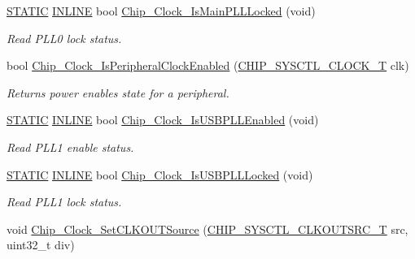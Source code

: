 \begin{DoxyCompactItemize}
\hyperlink{group__LPC__Types__Public__Macros_ga10b2d890d871e1489bb02b7e70d9bdfb}{S\+T\+A\+T\+IC} \hyperlink{group__LPC__Types__Public__Types_ga2eb6f9e0395b47b8d5e3eeae4fe0c116}{I\+N\+L\+I\+NE} bool \hyperlink{group__CLOCK__17XX__40XX_gaaa21bfa511cd25dc4f4394709dc58ced}{Chip\+\_\+\+Clock\+\_\+\+Is\+Main\+P\+L\+L\+Locked} (void)
\begin{DoxyCompactList}\small\item\em Read P\+L\+L0 lock status. \end{DoxyCompactList}\item 
bool \hyperlink{group__CLOCK__17XX__40XX_ga0d7f762be4d4293d10d379fcc0b2388b}{Chip\+\_\+\+Clock\+\_\+\+Is\+Peripheral\+Clock\+Enabled} (\hyperlink{group__CLOCK__17XX__40XX_ga82e75cbe777e79f448fec3987ddd978e}{C\+H\+I\+P\+\_\+\+S\+Y\+S\+C\+T\+L\+\_\+\+C\+L\+O\+C\+K\+\_\+T} clk)
\begin{DoxyCompactList}\small\item\em Returns power enables state for a peripheral. \end{DoxyCompactList}\item 
\hyperlink{group__LPC__Types__Public__Macros_ga10b2d890d871e1489bb02b7e70d9bdfb}{S\+T\+A\+T\+IC} \hyperlink{group__LPC__Types__Public__Types_ga2eb6f9e0395b47b8d5e3eeae4fe0c116}{I\+N\+L\+I\+NE} bool \hyperlink{group__CLOCK__17XX__40XX_ga0915951815b5bd5e32b7220784a96032}{Chip\+\_\+\+Clock\+\_\+\+Is\+U\+S\+B\+P\+L\+L\+Enabled} (void)
\begin{DoxyCompactList}\small\item\em Read P\+L\+L1 enable status. \end{DoxyCompactList}\item 
\hyperlink{group__LPC__Types__Public__Macros_ga10b2d890d871e1489bb02b7e70d9bdfb}{S\+T\+A\+T\+IC} \hyperlink{group__LPC__Types__Public__Types_ga2eb6f9e0395b47b8d5e3eeae4fe0c116}{I\+N\+L\+I\+NE} bool \hyperlink{group__CLOCK__17XX__40XX_gae0a614530296b96ef560bd2986277c3e}{Chip\+\_\+\+Clock\+\_\+\+Is\+U\+S\+B\+P\+L\+L\+Locked} (void)
\begin{DoxyCompactList}\small\item\em Read P\+L\+L1 lock status. \end{DoxyCompactList}\item 
void \hyperlink{group__CLOCK__17XX__40XX_ga0e8ed739d1ffa5480fc028b08a751d28}{Chip\+\_\+\+Clock\+\_\+\+Set\+C\+L\+K\+O\+U\+T\+Source} (\hyperlink{group__CLOCK__17XX__40XX_ga157c4adb8f619a3aaf58dacca66a9292}{C\+H\+I\+P\+\_\+\+S\+Y\+S\+C\+T\+L\+\_\+\+C\+L\+K\+O\+U\+T\+S\+R\+C\+\_\+T} src, uint32\+\_\+t div)

\end{DoxyCompactItemize}
